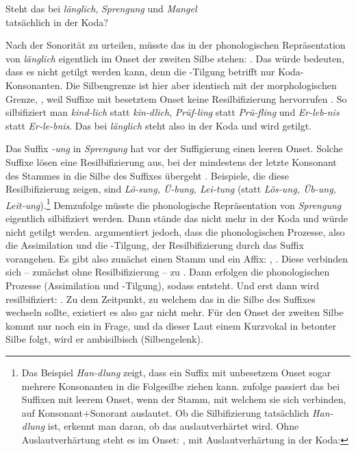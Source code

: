 \begin{Exkurs}{Steht das  bei \textit{länglich}, \textit{Sprengung} und \textit{Mangel}\\ tatsächlich in der Koda?}\label{ex:gTilgung}

Nach der Sonorität zu urteilen, müsste das  in der phonologischen Repräsentation von \textit{länglich} eigentlich im Onset der zweiten Silbe stehen: . Das würde bedeuten, dass es nicht getilgt werden kann, denn die -Tilgung betrifft nur Koda-Konsonanten. Die Silbengrenze ist hier aber identisch mit der morphologischen Grenze, , weil Suffixe mit besetztem Onset keine Resilbifizierung hervorrufen \citep[73]{Bergmann2018}. So silbifiziert man \textit{kind-lich} statt \textit{kin-dlich}, \textit{Prüf-ling} statt \textit{Prü-fling} und \textit{Er-leb-nis} statt \textit{Er-le-bnis}. Das  bei \textit{länglich} steht also in der Koda und wird getilgt.

Das Suffix \textit{-ung} in \textit{Sprengung} hat vor der Suffigierung einen leeren Onset. Solche Suffixe lösen eine Resilbifizierung aus, bei der mindestens der letzte Konsonant des Stammes in die Silbe des Suffixes übergeht \citep[813]{Hall1989}. Beispiele, die diese Resilbifizierung zeigen, sind \textit{Lö-sung, Ü-bung, Lei-tung} (statt \textit{Lös-ung, Üb-ung, Leit-ung}).\footnote{Das Beispiel \textit{Han-dlung} zeigt, dass ein Suffix mit unbesetzem Onset sogar mehrere Konsonanten in die Folgesilbe ziehen kann. \citet[815]{Hall1989} zufolge passiert das bei Suffixen mit leerem Onset, wenn der Stamm, mit welchem sie sich verbinden, auf Konsonant+Sonorant auslautet. Ob die Silbifizierung tatsächlich \textit{Han-dlung} ist, erkennt man daran, ob das  auslautverhärtet wird. Ohne Auslautverhärtung steht es im Onset: , mit Auslautverhärtung in der Koda: } Demzufolge müsste die phonologische Repräsentation von \textit{Sprengung} eigentlich  silbifiziert werden. Dann stände das  nicht mehr in der Koda und würde nicht getilgt werden. \citet[819--820]{Hall1989} argumentiert jedoch, dass die phonologischen Prozesse, also die Assimilation und die -Tilgung, der Resilbifizierung durch das Suffix vorangehen. Es gibt also zunächst einen Stamm und ein Affix: , . Diese verbinden sich \newline-- zunächst ohne Resilbifizierung -- zu . Dann erfolgen die phonologischen Prozesse (Assimilation und -Tilgung), sodass \textipa{[SpKEN.UN]} entsteht. Und erst dann wird resilbifiziert: . Zu dem Zeitpunkt, zu welchem das  in die Silbe des Suffixes wechseln sollte, existiert es also gar nicht mehr. Für den Onset der zweiten Silbe kommt nur noch ein \textipa{[N]} in Frage, und da dieser Laut einem Kurzvokal in betonter Silbe folgt, wird er ambisilbisch (Silbengelenk).


\end{Exkurs}
